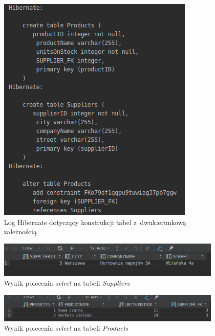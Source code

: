 \documentclass[12pt, a4paper]{mwart}
\begin{document}
\begin{figure}[ht]
  \centering
  \includegraphics[scale=0.75]{V/5-1.png}
  \caption{Log Hibernate dotyczący konstrukcji tabel z~dwukierunkową zależnością}
  \label{rys:5.1}
\end{figure}

\begin{figure}[ht]
  \centering
  \includegraphics[scale=0.5]{V/5-2.png}
  \caption{Wynik polecenia \textit{select} na tabeli \textit{Suppliers}}
  \label{rys:5.2}
\end{figure}

\begin{figure}[ht]
  \centering
  \includegraphics[scale=0.5]{V/5-3.png}
  \caption{Wynik polecenia \textit{select} na tabeli \textit{Products}}
  \label{rys:5.3}
\end{figure}
\end{document}
